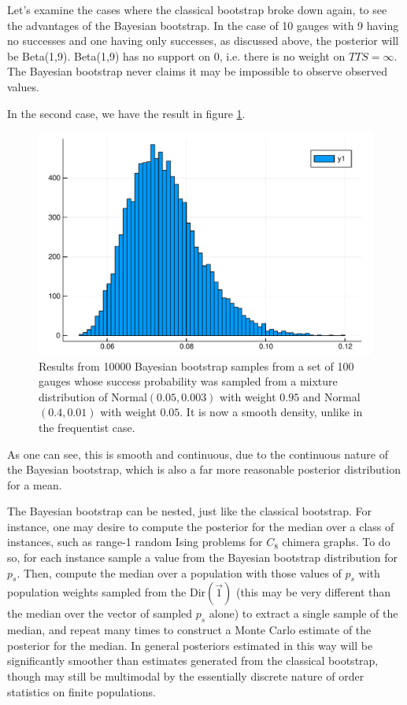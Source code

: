 Let's examine the cases where the classical bootstrap broke down again, to see the advantages of the Bayesian bootstrap. In the case of 10 gauges with 9 having no successes and one having only successes, as discussed above, the posterior will be Beta(1,9). Beta(1,9) has no support on 0, i.e. there is no weight on $TTS=\infty$. The Bayesian bootstrap never claims it may be impossible to observe observed values.

In the second case, we have the result in figure \ref{fig:pointy_BB}.

\begin{figure}[hbt]
  \includegraphics[width=\columnwidth]{chapters/Benchmarking/pointy_BB}
  \caption{Results from 10000 Bayesian bootstrap samples from a set of 100 gauges whose success probability was sampled from a mixture distribution of Normal$(0.05,0.003)$ with weight $0.95$ and Normal$(0.4,0.01)$ with weight $0.05$. It is now a smooth density, unlike in the frequentist case.}
  \label{fig:pointy_BB}
\end{figure}

As one can see, this is smooth and continuous, due to the continuous nature of the Bayesian bootstrap, which is also a far more reasonable posterior distribution for a mean.

The Bayesian bootstrap can be nested, just like the classical bootstrap. For instance, one may desire to compute the posterior for the median over a class of instances, such as range-1 random Ising problems for $C_8$ chimera graphs. To do so, for each instance sample a value from the Bayesian bootstrap distribution for $p_s$. Then, compute the median over a population with those values of $p_s$ with population weights sampled from the Dir$(\vec{1})$ (this may be very different than the median over the vector of sampled $p_s$ alone) to extract a single sample of the median, and repeat many times to construct a Monte Carlo estimate of the posterior for the median. In general posteriors estimated in this way will be significantly smoother than estimates generated from the classical bootstrap, though may still be multimodal by the essentially discrete nature of order statistics on finite populations.

